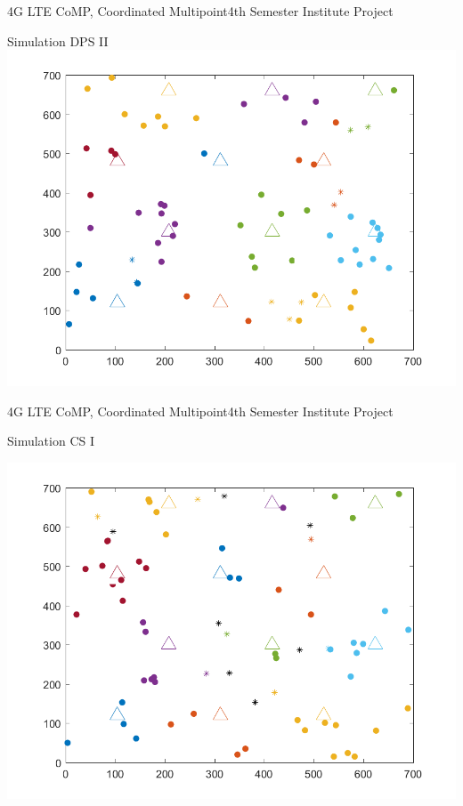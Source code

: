 \documentclass[xcolor={cmyk}]{beamer}
\begin{document}
 \begin{frame}{4G LTE CoMP, Coordinated Multipoint}{4th Semester Institute Project}
 \begin{block}{Simulation DPS II}
 \includegraphics[width=\linewidth,height=\textheight,keepaspectratio]{MapPlotDPS2.png}
 \end{block}
 \end{frame}
 
 \begin{frame}{4G LTE CoMP, Coordinated Multipoint}{4th Semester Institute Project}
 \begin{block}{Simulation CS I}
 
 \includegraphics[width=\linewidth,height=\textheight,keepaspectratio]{MapPlotCS1.png}
 \end{block}
 \end{frame}
 
\end{document}
